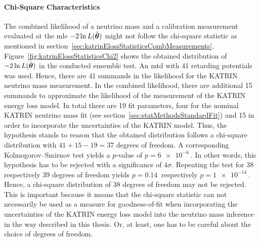 \paragraph{Chi-Square Characteristics}
The combined likelihood of a neutrino mass and a calibration measurement evaluated at the \gls{mle} $-2\ln L(\hat{\boldsymbol{\mathbf{\theta}}})$ might not follow the chi-square statistic as mentioned in section~\ref{sec:katrinElossStatisticsCombMeasurements}. Figure~\ref{fig:katrinElossStatisticsChi2} shows the obtained distribution of $-2\ln L(\hat{\boldsymbol{\mathbf{\theta}}})$ in the conducted ensemble test. An \gls{mtd} with 41 retarding potentials was used. Hence, there are 41 summands in the likelihood for the KATRIN neutrino mass measurement. In the combined likelihood, there are additional 15 summands to approximate the likelihood of the measurement of the KATRIN energy loss model. In total there are 19 fit parameters, four for the nominal KATRIN neutrino mass fit (see section~\ref{sec:statMethodsStandardFit}) and 15 in order to incorporate the uncertainties of the KATRIN model. Thus, the hypothesis stands to reason that the obtained distribution follows a chi-square distribution with $41+15-19=37$ degrees of freedom. A corresponding Kolmogorov–Smirnov test yields a $p$-value of $p=\SI{6e-6}{}$. In other words, this hypothesis has to be rejected with a significance of $4\sigma$. Repeating the test for 38 respectively 39 degrees of freedom yields $p=\SI{0.14}{}$ respectively $p=\SI{1e-14}{}$. Hence, a chi-square distribution of 38 degrees of freedom may not be rejected. This is important because it means that the chi-square statistic can not necessarily be used as a measure for goodness-of-fit when incorporating the uncertainties of the KATRIN energy loss model into the neutrino mass inference in the way described in this thesis. Or, at least, one has to be careful about the choice of degrees of freedom.


